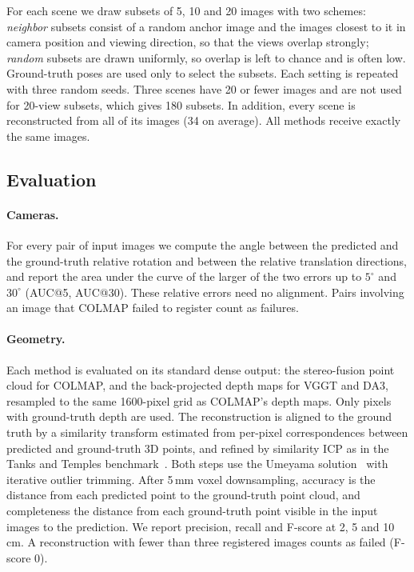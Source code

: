 \documentclass[10pt,twocolumn,letterpaper]{article}
\begin{document}
For each scene we draw subsets of 5, 10 and 20 images with two schemes: \emph{neighbor} subsets consist of a
random anchor image and the images closest to it in camera position and viewing direction, so that the views
overlap strongly; \emph{random} subsets are drawn uniformly, so overlap is left to chance and is often low.
Ground-truth poses are used only to select the subsets. Each setting is repeated with three random seeds.
Three scenes have 20 or fewer images and are not used for 20-view subsets, which gives 180 subsets. In addition,
every scene is reconstructed from all of its images (34 on average). All methods receive exactly the same
images.

\subsection{Evaluation}

\paragraph{Cameras.}
For every pair of input images we compute the angle between the predicted and the ground-truth relative
rotation and between the relative translation directions, and report the area under the curve of the larger
of the two errors up to $5^\circ$ and $30^\circ$ (AUC@5, AUC@30). These relative errors need no alignment.
Pairs involving an image that COLMAP failed to register count as failures.

\paragraph{Geometry.}
Each method is evaluated on its standard dense output: the stereo-fusion point cloud for COLMAP, and the
back-projected depth maps for VGGT and DA3, resampled to the same 1600-pixel grid as COLMAP's depth maps.
Only pixels with ground-truth depth are used. The reconstruction is aligned to the ground truth by a similarity
transform estimated from per-pixel correspondences between predicted and ground-truth 3D points, and refined by
similarity ICP as in the Tanks and Temples benchmark~\cite{knapitsch2017tanks}. Both steps use the
Umeyama solution~\cite{umeyama1991} with iterative outlier trimming. After 5\,mm voxel downsampling, accuracy is
the distance from each predicted point to the ground-truth point cloud, and completeness the distance from each
ground-truth point visible in the input images to the prediction. We report precision, recall and F-score at
2, 5 and 10\,cm. A reconstruction with fewer than three registered images counts as failed (F-score 0).
\end{document}

